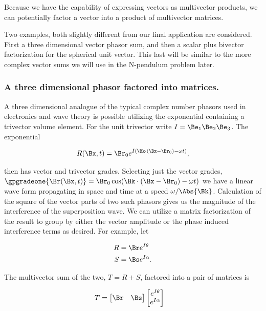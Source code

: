 Because we have the capability of expressing vectors as multivector products, we can potentially factor a vector into a product of multivector matrices.

Two examples, both slightly different from our final application are considered.  First a three dimensional vector phasor sum, and then a scalar plus bivector factorization for the spherical unit vector.  This last will be similar to the more complex vector sums we will use in the N-pendulum problem later.

\subsubsection{A three dimensional phasor factored into matrices.}

A three dimensional analogue of the typical complex number phasors used in electronics and wave theory is possible utilizing the exponential containing a trivector volume element.  For the unit trivector write $I = \Be_1 \Be_2 \Be_3$.  The exponential

\begin{align}\label{eqn:mp110}
R(\Bx, t) = \Br_0 e^{I(\Bk \cdot (\Bx - \Br_0) - \omega t)},
\end{align}

then has vector and trivector grades.  Selecting just the vector grades, $\gpgradeone{\Br(\Bx, t)} = \Br_0 \cos(\Bk \cdot (\Bx - \Br_0) - \omega t)$ we have a linear wave form propagating in space and time at a speed $\omega/\Abs{\Bk}$.  Calculation of the square of the vector parts of two such phasors gives us the magnitude of the interference of the superposition wave.  We can utilize a matrix factorization of the result to group by either the vector amplitude or the phase induced interference terms as desired.  For example, let

\begin{align}\label{eqn:mp120}
R &= \Br e^{I\theta} \\
S &= \Bs e^{I\alpha}.
\end{align}

The multivector sum of the two, $T = R + S$, factored into a pair of matrices is

\begin{align}\label{eqn:mp130}
T &=
\begin{bmatrix}
\Br & \Bs 
\end{bmatrix}
\begin{bmatrix}
e^{I\theta} \\
e^{I\alpha}
\end{bmatrix}
\end{align}

